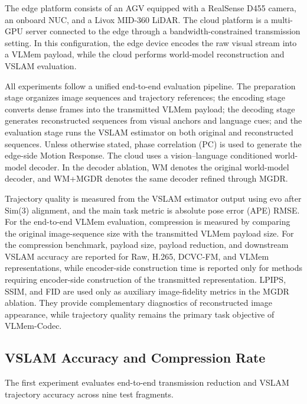 \documentclass[journal]{IEEEtran}
\newcommand{\VLMemCodec}{VLMem-Codec}
\begin{document}
The edge platform consists of an AGV equipped with a RealSense D455 camera, an onboard NUC, and a Livox MID-360 LiDAR. The cloud platform is a multi-GPU server connected to the edge through a bandwidth-constrained transmission setting. In this configuration, the edge device encodes the raw visual stream into a VLMem payload, while the cloud performs world-model reconstruction and VSLAM evaluation.

All experiments follow a unified end-to-end evaluation pipeline. The preparation stage organizes image sequences and trajectory references; the encoding stage converts dense frames into the transmitted VLMem payload; the decoding stage generates reconstructed sequences from visual anchors and language cues; and the evaluation stage runs the VSLAM estimator on both original and reconstructed sequences. Unless otherwise stated, phase correlation (PC) is used to generate the edge-side Motion Response. The cloud uses a vision--language conditioned world-model decoder. In the decoder ablation, WM denotes the original world-model decoder, and WM+MGDR denotes the same decoder refined through MGDR.

Trajectory quality is measured from the VSLAM estimator output using evo after Sim(3) alignment, and the main task metric is absolute pose error (APE) RMSE. For the end-to-end VLMem evaluation, compression is measured by comparing the original image-sequence size with the transmitted VLMem payload size. For the compression benchmark, payload size, payload reduction, and downstream VSLAM accuracy are reported for Raw, H.265, DCVC-FM, and VLMem representations, while encoder-side construction time is reported only for methods requiring encoder-side construction of the transmitted representation. LPIPS, SSIM, and FID are used only as auxiliary image-fidelity metrics in the MGDR ablation. They provide complementary diagnostics of reconstructed image appearance, while trajectory quality remains the primary task objective of \VLMemCodec{}.

\subsection{VSLAM Accuracy and Compression Rate}
\label{subsec:compression_accuracy}

The first experiment evaluates end-to-end transmission reduction and VSLAM trajectory accuracy across nine test fragments.


\end{document}
